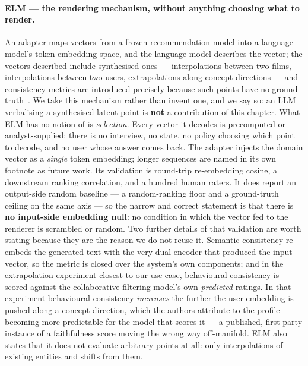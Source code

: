\documentclass[11pt]{article}
\begin{document}
\paragraph{ELM --- the rendering mechanism, without anything choosing what to render.} An adapter maps
vectors from a frozen recommendation model into a language model's token-embedding space, and the
language model describes the vector; the vectors described include synthesised ones ---
interpolations between two films, interpolations between two users, extrapolations along concept
directions --- and consistency metrics are introduced precisely because such points have no ground
truth~\cite{tennenholtz2023elm}. We take this mechanism rather than invent one, and we say so: an LLM verbalising a
synthesised latent point is \textbf{not} a contribution of this chapter. What ELM has no notion of is
\emph{selection}. Every vector it decodes is precomputed or analyst-supplied; there is no interview,
no state, no policy choosing which point to decode, and no user whose answer comes back. The adapter
injects the domain vector as a \emph{single} token embedding; longer sequences are named in its own
footnote as future work. Its validation is round-trip re-embedding cosine, a downstream ranking
correlation, and a hundred human raters. It does report an output-side random baseline --- a
random-ranking floor and a ground-truth ceiling on the same axis --- so the narrow and correct
statement is that there is \textbf{no input-side embedding null}: no condition in which the vector
fed to the renderer is scrambled or random. Two further details of that validation are worth stating
because they are the reason we do not reuse it. Semantic consistency re-embeds the generated text
with the very dual-encoder that produced the input vector, so the metric is closed over the system's
own components; and in the extrapolation experiment closest to our use case, behavioural consistency
is scored against the collaborative-filtering model's own \emph{predicted} ratings. In that
experiment behavioural consistency \emph{increases} the further the user embedding is pushed along a
concept direction, which the authors attribute to the profile becoming more predictable for the model
that scores it --- a published, first-party instance of a faithfulness score moving the wrong way
off-manifold. ELM also states that it does not evaluate arbitrary points at all: only interpolations
of existing entities and shifts from them.
\end{document}
